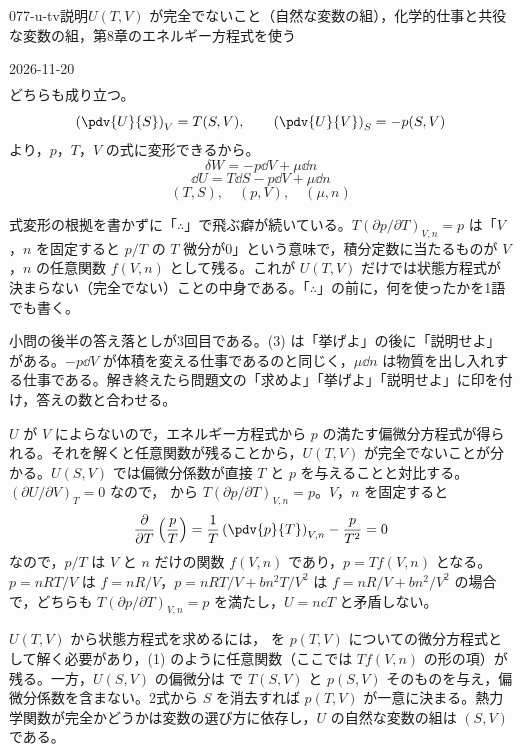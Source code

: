 \documentclass[uplatex,dvipdfmx,a4paper,11pt]{jsarticle}
\begin{document}
\begin{mondai}{077-u-tv}{説明}{$U(T,V)$ が完全でないこと（自然な変数の組），化学的仕事と共役な変数の組，第8章のエネルギー方程式を使う}
\begin{kotaeutsushi}{2026-11-20}
\begin{align*}
\end{align*}
どちらも成り立つ。
\[ \left(\pdv{U}{S}\right)_{V}=T(S,V), \qquad \left(\pdv{U}{V}\right)_{S}=-p(S,V) \]
より，$p$，$T$，$V$ の式に変形できるから。
\[ \delta W=-p\dd V+\mu\dd n \]
\[ \dd U=T\dd S-p\dd V+\mu\dd n \]
\[ (T,S),\quad (p,V),\quad (\mu,n) \]
\end{kotaeutsushi}
\begin{kizuki}
\item {} 式変形の根拠を書かずに「$\therefore$」で飛ぶ癖が続いている。$T(\partial p/\partial T)_{V,n}=p$ は「$V$，$n$ を固定すると $p/T$ の $T$ 微分が0」という意味で，積分定数に当たるものが $V$，$n$ の任意関数 $f(V,n)$ として残る。これが $U(T,V)$ だけでは状態方程式が決まらない（完全でない）ことの中身である。「$\therefore$」の前に，何を使ったかを1語でも書く。
\item {} 小問の後半の答え落としが3回目である。(3) は「挙げよ」の後に「説明せよ」がある。$-p\dd V$ が体積を変える仕事であるのと同じく，$\mu\dd n$ は物質を出し入れする仕事である。解き終えたら問題文の「求めよ」「挙げよ」「説明せよ」に印を付け，答えの数と合わせる。
\end{kizuki}
\begin{tadashii}
\houshin $U$ が $V$ によらないので，エネルギー方程式から $p$ の満たす偏微分方程式が得られる。それを解くと任意関数が残ることから，$U(T,V)$ が完全でないことが分かる。$U(S,V)$ では偏微分係数が直接 $T$ と $p$ を与えることと対比する。
\keisan {} $(\partial U/\partial V)_{T} = 0$ なので， から $T(\partial p/\partial T)_{V,n} = p$。$V$，$n$ を固定すると
\[ \frac{\partial}{\partial T}\left(\frac{p}{T}\right) =\frac{1}{T}\left(\pdv{p}{T}\right)_{V,n} - \frac{p}{T^{2}} = 0 \]
なので，$p/T$ は $V$ と $n$ だけの関数 $f(V,n)$ であり，$p = Tf(V,n)$ となる。$p = nRT/V$ は $f = nR/V$，$p = nRT/V + bn^{2}T/V^{2}$ は $f = nR/V + bn^{2}/V^{2}$ の場合で，どちらも $T(\partial p/\partial T)_{V,n} = p$ を満たし，$U = ncT$ と矛盾しない。

 $U(T,V)$ から状態方程式を求めるには， を $p(T,V)$ についての微分方程式として解く必要があり，(1) のように任意関数（ここでは $Tf(V,n)$ の形の項）が残る。一方，$U(S,V)$ の偏微分は  で $T(S,V)$ と $p(S,V)$ そのものを与え，偏微分係数を含まない。2式から $S$ を消去すれば $p(T,V)$ が一意に決まる。熱力学関数が完全かどうかは変数の選び方に依存し，$U$ の自然な変数の組は $(S,V)$ である。


\end{tadashii}
\end{mondai}
\end{document}
